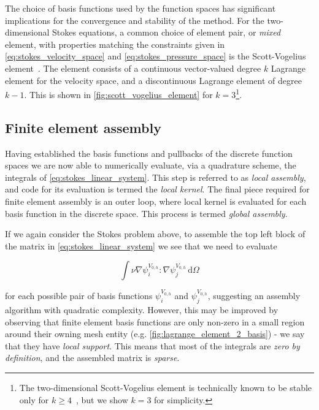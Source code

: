 \documentclass[thesis]{subfiles}
\begin{document}
The choice of basis functions used by the function spaces has significant implications for the convergence and stability of the method.
For the two-dimensional Stokes equations, a common choice of element pair, or \textit{mixed} element, with properties matching the constraints given in \cref{eq:stokes_velocity_space} and \cref{eq:stokes_pressure_space} is the Scott-Vogelius element~\cite{scottNormEstimatesMaximal1985}.
The element consists of a continuous vector-valued degree $k$ Lagrange element for the velocity space, and a discontinuous Lagrange element of degree $k-1$.
This is shown in \cref{fig:scott_vogelius_element} for $k = 3$\footnote{The two-dimensional Scott-Vogelius element is technically known to be stable only for $k \geq 4$~\cite{guzmanScottVogeliusFiniteElements2018}, but we show $k = 3$ for simplicity.}.

\subsection{Finite element assembly}

Having established the basis functions and pullbacks of the discrete function spaces we are now able to numerically evaluate, via a quadrature scheme, the integrals of \cref{eq:stokes_linear_system}.
This step is referred to as \textit{local assembly}, and code for its evaluation is termed the \textit{local kernel}.
The final piece required for finite element assembly is an outer loop, where local kernel is evaluated for each basis function in the discrete space.
This process is termed \textit{global assembly}.

If we again consider the Stokes problem above, to assemble the top left block of the matrix in \cref{eq:stokes_linear_system} we see that we need to evaluate

\begin{equation}
  \int \nu \nabla \psi^{V_{0,h}}_i : \nabla \psi^{V_{0,h}}_j \, \textrm{d}\Omega
  \label{eq:stokes_top_left}
\end{equation}

\noindent
for each possible pair of basis functions $\psi^{V_{0,h}}_i$ and $\psi^{V_{0,h}}_j$, suggesting an assembly algorithm with quadratic complexity.
However, this may be improved by observing that finite element basis functions are only non-zero in a small region around their owning mesh entity (e.g. \cref{fig:lagrange_element_2_basis}) - we say that they have \textit{local support}.
This means that most of the integrals are \textit{zero by definition}, and the assembled matrix is \textit{sparse}.
\end{document}
